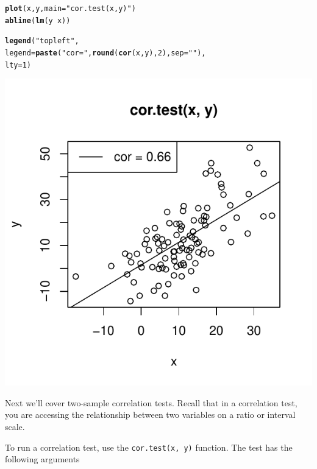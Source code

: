 \documentclass{tufte-book}\usepackage[]{graphicx}\usepackage[]{color}
\makeatletter
\def\maxwidth{ %
  \ifdim\Gin@nat@width>\linewidth
    \linewidth
  \else
    \Gin@nat@width
  \fi
}
\newcommand{\hlnum}[1]{\textcolor[rgb]{0.686,0.059,0.569}{#1}}%
\newcommand{\hlstr}[1]{\textcolor[rgb]{0.192,0.494,0.8}{#1}}%
\newcommand{\hlopt}[1]{\textcolor[rgb]{0,0,0}{#1}}%
\newcommand{\hlstd}[1]{\textcolor[rgb]{0.345,0.345,0.345}{#1}}%
\newcommand{\hlkwc}[1]{\textcolor[rgb]{0.333,0.667,0.333}{#1}}%
\newcommand{\hlkwd}[1]{\textcolor[rgb]{0.737,0.353,0.396}{\textbf{#1}}}%
\newenvironment{kframe}{%
 \def\at@end@of@kframe{}%
 \ifinner\ifhmode%
  \def\at@end@of@kframe{\end{minipage}}%
  \begin{minipage}{\columnwidth}%
 \fi\fi%
 \def\FrameCommand##1{\hskip\@totalleftmargin \hskip-\fboxsep
 \colorbox{shadecolor}{##1}\hskip-\fboxsep
     \hskip-\linewidth \hskip-\@totalleftmargin \hskip\columnwidth}%
 \MakeFramed {\advance\hsize-\width
   \@totalleftmargin\z@ \linewidth\hsize
   \@setminipage}}%
 {\par\unskip\endMakeFramed%
 \at@end@of@kframe}
\newenvironment{knitrout}{}{} %
\makeatother
\begin{document}
\begin{footnotesize}
\begin{marginfigure}
\begin{tiny}
\begin{knitrout}
\begin{kframe}
\begin{alltt}
\hlkwd{plot}\hlstd{(x, y,} \hlkwc{main} \hlstd{=} \hlstr{"cor.test(x, y)"}\hlstd{)}
\hlkwd{abline}\hlstd{(}\hlkwd{lm}\hlstd{(y} \hlopt{~} \hlstd{x))}

\hlkwd{legend}\hlstd{(}\hlstr{"topleft"}\hlstd{,}
       \hlkwc{legend} \hlstd{=} \hlkwd{paste}\hlstd{(}\hlstr{"cor = "}\hlstd{,} \hlkwd{round}\hlstd{(}\hlkwd{cor}\hlstd{(x, y),} \hlnum{2}\hlstd{),} \hlkwc{sep} \hlstd{=} \hlstr{""}\hlstd{),}
       \hlkwc{lty} \hlstd{=} \hlnum{1}\hlstd{)}
\end{alltt}
\end{kframe}
\includegraphics[width=\maxwidth]{figure/unnamed-chunk-234-1} 

\end{knitrout}
\end{tiny}
\end{marginfigure}


Next we'll cover two-sample correlation tests. Recall that in a correlation test, you are accessing the relationship between two variables on a ratio or interval scale.

To run a correlation test, use the \texttt{cor.test(x, y)} function. The test has the following arguments



\end{footnotesize}
\end{document}

